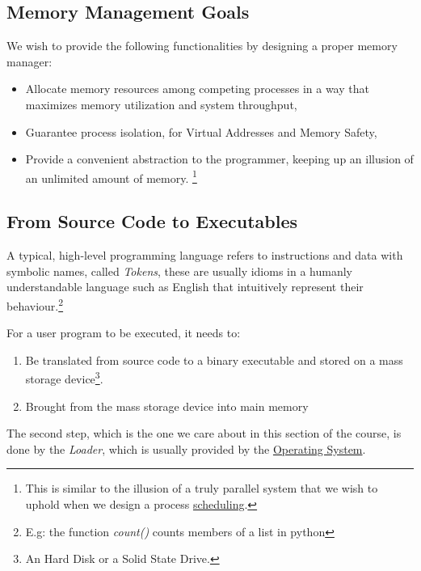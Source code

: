 \documentclass[openright, twoside]{report}
\theoremstyle{definition}
\theoremstyle{example}
\begin{document}
		\subsection{Memory Management Goals}
			We wish to provide the following functionalities by designing a proper memory manager:
			\begin{itemize}
				\item Allocate memory resources among competing processes in a way that maximizes memory utilization and system throughput,
				\item Guarantee process isolation, for Virtual Addresses and Memory Safety,
				\item Provide a convenient abstraction to the programmer, keeping up an illusion of an unlimited amount of memory. \footnote{This is similar 
				to the illusion of a truly parallel system that we wish to uphold when we design a process \hyperref[sec:scheduling]{scheduling}.}
			\end{itemize}
		
		\subsection{From Source Code to Executables}

		A typical, high-level programming language refers to instructions and data with symbolic names, called \emph{Tokens},
		these are usually idioms in a humanly understandable language such as English that intuitively represent their behaviour.\footnote{E.g: the function
		\emph{count()} counts members of a list in python}


		For a user program to be executed, it needs to:
		\begin{enumerate}
			\item Be translated from source code to a binary executable and stored on a mass storage device\footnote{An Hard Disk or a Solid State Drive.}.
			\item Brought from the mass storage device into main memory
		\end{enumerate}

		The second step, which is the one we care about in this section of the course, is done by the \emph{Loader}, which is usually provided by the 
		\hyperref[sec:OS]{Operating System}.
\end{document}
